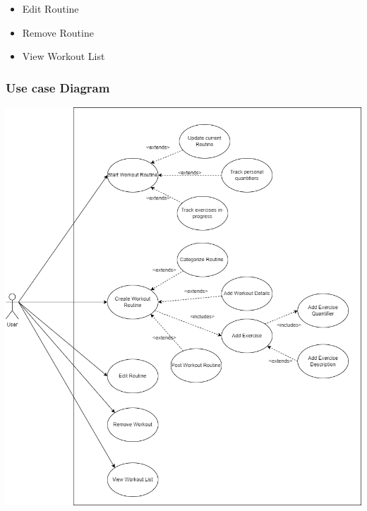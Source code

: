\documentclass[12pt]{article}
\begin{document}
\begin{itemize}
\begin{itemize}
		\item Edit Routine
		\item Remove Routine
		\item View Workout List
	\end{itemize}
	
	\subsubsection{Use case Diagram}
	\includegraphics[scale=0.5]{srs_usecase_diagram_routines}
	\newpage

\end{itemize}
\end{document}
